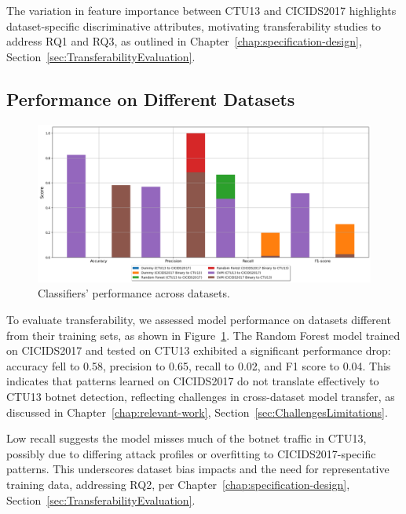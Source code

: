 The variation in feature importance between CTU13 and CICIDS2017 highlights dataset-specific discriminative attributes, motivating transferability studies to address RQ1 and RQ3, as outlined in Chapter~\ref{chap:specification-design}, Section~\ref{sec:TransferabilityEvaluation}.

\subsection{Performance on Different Datasets}\label{subsec:performance-different-dataset}

\begin{figure}[H]
\centering
\includegraphics[width=1\textwidth]{img/Classifier_Performance _Across_Datasets.png}
\caption{Classifiers' performance across datasets.}\label{fig:classifier_performance_across_dataset}
\end{figure}

To evaluate transferability, we assessed model performance on datasets different from their training sets, as shown in Figure~\ref{fig:classifier_performance_across_dataset}. The Random Forest model trained on CICIDS2017 and tested on CTU13 exhibited a significant performance drop: accuracy fell to 0.58, precision to 0.65, recall to 0.02, and F1 score to 0.04. This indicates that patterns learned on CICIDS2017 do not translate effectively to CTU13 botnet detection, reflecting challenges in cross-dataset model transfer, as discussed in Chapter~\ref{chap:relevant-work}, Section~\ref{sec:ChallengesLimitations}.

Low recall suggests the model misses much of the botnet traffic in CTU13, possibly due to differing attack profiles or overfitting to CICIDS2017-specific patterns. This underscores dataset bias impacts and the need for representative training data, addressing RQ2, per Chapter~\ref{chap:specification-design}, Section~\ref{sec:TransferabilityEvaluation}.

